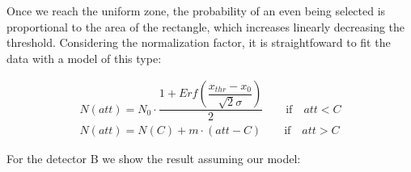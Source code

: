Once we reach the uniform zone, the probability of an even being selected is proportional to the area of the rectangle, which increases linearly decreasing the threshold. Considering the normalization factor, it is straightfoward to fit the data with a model of this type:

\begin{equation}
\begin{split}
N(att) = N_{0} \cdot \dfrac{1 + Erf(\dfrac{x_{thr} - x_{0}}{\sqrt{2} \sigma })}{2} \qquad \text{if} \quad att < C  \\
N(att) = N(C) + m \cdot (att - C) \qquad \text{if} \quad att > C
\end{split}
\end{equation}

For the detector B we show the result assuming our model: 

\begin{figure}[hbtp]
\centering
{}
\end{figure}

